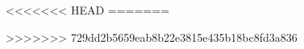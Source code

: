 \documentclass{ZJUThesis}
\begin{document}
  \listoftables

  \listoffigures



\mainmatter

<<<<<<< HEAD
%  
=======
  
>>>>>>> 729dd2b5659eab8b22e3815e435b18bc8fd3a836
  
  
  

  


%  



\backmatter


  

  

  
\end{document}
